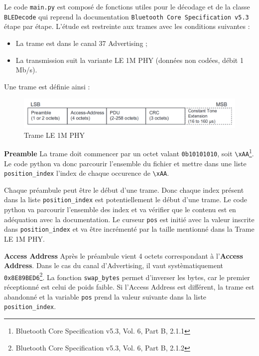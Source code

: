 Le code \texttt{main.py} est composé de fonctions utiles pour le
décodage et de la classe \texttt{BLEDecode} qui reprend la documentation
\texttt{Bluetooth\ Core\ Specification\ v5.3} étape par étape. L'étude
est restreinte aux trames avec les conditions suivantes :

\begin{itemize}
\tightlist
\item
  La trame est dans le canal 37 Advertising ;
\item
  La transmission suit la variante LE 1M PHY (données non codées, débit
  1 Mb/s).
\end{itemize}

Une trame est définie ainsi :

\begin{figure}
\centering
\includegraphics{static/trame.png}
\caption{Trame LE 1M PHY}
\end{figure}

\textbf{Preamble} La trame doit commencer par un octet valant
\texttt{0b10101010}, soit \texttt{\textbackslash{}xAA}\footnote{Bluetooth
  Core Specification v5.3, Vol. 6, Part B, 2.1.1}. Le code python va
donc parcourir l'ensemble du fichier et mettre dans une liste
\texttt{position\_index} l'index de chaque occurence de
\texttt{\textbackslash{}xAA}.

Chaque préambule peut être le début d'une trame. Donc chaque index
présent dans la liste \texttt{position\_index} est potentiellement le
début d'une trame. Le code python va parcourir l'ensemble des index et
va vérifier que le contenu est en adéquation avec la documentation. Le
curseur \texttt{pos} est initié avec la valeur inscrite dans
\texttt{position\_index} et va être incrémenté par la taille mentionné
dans la Trame LE 1M PHY.

\textbf{Access Address} Après le préambule vient 4 octets correspondant
à l'\textbf{Access Address}. Dans le cas du canal d'Advertising, il vaut
systèmatiquement \texttt{0x8E89BED6}\footnote{Bluetooth Core
  Specification v5.3, Vol. 6, Part B, 2.1.2}. La fonction
\texttt{swap\_bytes} permet d'inverser les bytes, car le premier
réceptionné est celui de poids faible. Si l'Access Address est
différent, la trame est abandonné et la variable \texttt{pos} prend la
valeur suivante dans la liste \texttt{position\_index}.

